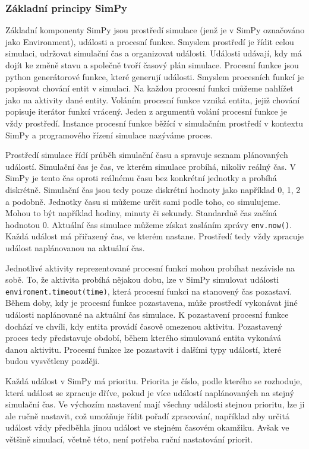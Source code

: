 \documentclass[12pt,a4paper]{article}
\begin{document}
\subsubsection{Základní principy SimPy}
Základní komponenty SimPy jsou prostředí simulace (jenž je v SimPy označováno jako Environment), události a procesní funkce. Smyslem prostředí je řídit celou simulaci, udržovat simulační čas a organizovat události. Události udávají, kdy má dojít ke změně stavu a společně tvoří časový plán simulace. Procesní funkce jsou python generátorové funkce, které generují události. Smyslem procesních funkcí je popisovat chování entit v simulaci. Na každou procesní funkci můžeme nahlížet jako na aktivity dané entity. Voláním procesní funkce vzniká entita, jejiž chování popisuje iterátor funkcí vrácený. Jeden z argumentů volání procesní funkce je vždy prostředí. Instance procesní funkce běžící v simulačním prostředí v kontextu SimPy a programového řízení simulace nazýváme proces.

Prostředí simulace řídí průběh simulační času a spravuje seznam plánovaných událostí. Simulační čas je čas, ve kterém simulace probíhá, nikoliv reálný čas. V SimPy je tento čas oproti reálnému času bez konkrétní jednotky a probíhá diskrétně. Simulační čas jsou tedy pouze diskrétní hodnoty jako například 0, 1, 2 a podobně. Jednotky času si můžeme určit sami podle toho, co simulujeme. Mohou to být například hodiny, minuty či sekundy. Standardně čas začíná hodnotou 0. Aktuální čas simulace můžeme získat zasláním zprávy \texttt{env.now()}. Každá událost má přiřazený čas, ve kterém nastane. Prostředí tedy vždy zpracuje událost naplánovanou na aktuální čas.

Jednotlivé aktivity reprezentované procesní funkcí mohou probíhat nezávisle na sobě. To, že aktivita probíhá nějakou dobu, lze v SimPy simulovat události \texttt{enviroment.timeout(time)}, která procesní funkci na stanovený čas pozastaví. Během doby, kdy je procesní funkce pozastavena, může prostředí vykonávat jiné události naplánované na aktuální čas simulace. K pozastavení procesní funkce dochází ve chvíli, kdy entita provádí časově omezenou aktivitu. Pozastavený proces tedy představuje období, během kterého simulovaná entita vykonává danou aktivitu. Procesní funkce lze pozastavit i dalšími typy událostí, které budou vysvětleny později.

Každá událost v SimPy má prioritu. Priorita je číslo, podle kterého se rozhoduje, která událost se zpracuje dříve, pokud je více událostí naplánovaných na stejný simulační čas.
Ve výchozím nastavení mají všechny události stejnou prioritu, lze ji ale ručně nastavit, což umožňuje řídit pořadí zpracování, například aby určitá událost vždy předběhla jinou událost ve stejném časovém okamžiku. Avšak ve většině simulací, včetně této, není potřeba ruční nastatování priorit.
\end{document}
